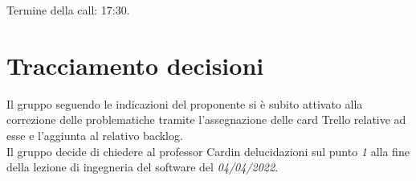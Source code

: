 \noindent Termine della call: 17:30.

\section{Tracciamento decisioni}
Il gruppo seguendo le indicazioni del proponente si è subito attivato alla correzione delle problematiche tramite l'assegnazione delle card Trello relative ad esse e l'aggiunta al relativo backlog.\\
Il gruppo decide di chiedere al professor Cardin delucidazioni sul punto \textit{1} alla fine della lezione di ingegneria del software del \textit{04/04/2022}.
